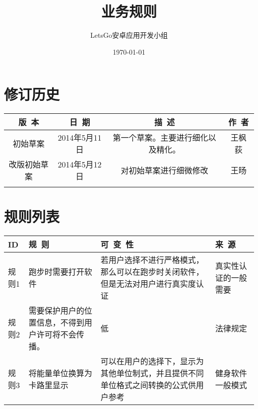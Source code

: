\documentclass [a4paper,11pt]{article}
\title{业务规则}
\date{\today}
\author{LetsGo安卓应用开发小组}
\begin{document}
	
\maketitle
\section*{修订历史}

\begin{table}[!hbp]
\centering

\begin{tabular*}{0.95\textwidth}{c|c|c|c}
\hline
\rule{0pt}{0.8cm}
版~本 & 日~期 & 描~述 & 作~者\\
\hline
\rule{0pt}{0.6cm}
初始草案 & 2014年5月11日 & 第一个草案。主要进行细化以及精化。 & 王枫荻 \\
\hline
\rule{0pt}{0.6cm}
改版初始草案 & 2014年5月12日 & 对初始草案进行细微修改 & 王旸 \\
\hline
\rule{0pt}{0.6cm}
 &  &  & \\
\hline
\end{tabular*}

\end{table}

\section*{规则列表}

\begin{table}[!hbp]
\centering

\begin{tabular*}{\textwidth}{p{}|p{}|p{}|p{}}
\hline
\rule{0pt}{0.8cm}
ID & 规~则 & 可~变~性 & 来~源\\

\hline
\rule{0pt}{0.6cm}
规则1 & 跑步时需要打开软件 & 若用户选择不进行严格模式，那么可以在跑步时关闭软件，但是无法对用户进行真实度认证 & 真实性认证的一般需要\\

\hline
\rule{0pt}{0.6cm}
规则2 & 需要保护用户的位置信息，不得到用户许可将不会传播。 & 低 & 法律规定\\

\hline
\rule{0pt}{0.6cm}
规则3 & 将能量单位换算为卡路里显示 & 可以在用户的选择下，显示为其他单位制式，并且提供不同单位格式之间转换的公式供用户参考 & 健身软件一般模式\\
 
\hline
\end{tabular*}

\end{table}

  
\end{document}

